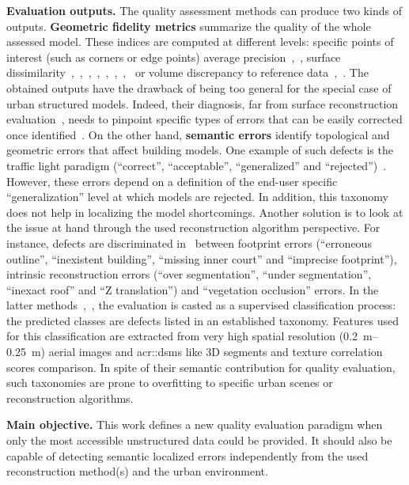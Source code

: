 \documentclass[runningheads]{llncs}
\begin{document}
\noindent
\textbf{Evaluation outputs.}
The quality assessment methods can produce two kinds of outputs. \textbf{Geometric fidelity metrics} summarize the quality of the whole assessed model. These indices are computed at different levels: specific points of interest (such as corners or edge points) average precision~\cite{vogtle2003quality},~\cite{Kaartinen2005}, surface dissimilarity~\cite{jaynes2003recognition},~\cite{dick2004modelling},~\cite{Kaartinen2005},~\cite{zebedin2008fusion},~\cite{lafarge2012creating},~\cite{Zeng2014},~\cite{li2016boxfitting},~\cite{nan2017polyfit} or volume discrepancy to reference data~\cite{jaynes2003recognition},~\cite{Zeng2014}. The obtained outputs have the drawback of being too general for the special case of urban structured models. Indeed, their diagnosis, far from surface reconstruction evaluation~\cite{berger2013benchmark}, needs to pinpoint specific types of errors that can be easily corrected once identified~\cite{OudeElberink2010}. On the other hand, \textbf{semantic errors} identify topological and geometric errors that affect building models. One example of such defects is the traffic light paradigm (``correct'', ``acceptable'', ``generalized'' and ``rejected'')~\cite{boudet2006supervised}. However, these errors depend on a  definition of the end-user specific ``generalization'' level at which models are rejected. In addition, this taxonomy does not help in localizing the model shortcomings. Another solution is to look at the issue at hand through the used reconstruction algorithm perspective. For instance, defects are discriminated in~\cite{Michelin2013} between footprint errors (``erroneous outline'', ``inexistent building'', ``missing inner court'' and ``imprecise footprint''), intrinsic reconstruction errors (``over segmentation'', ``under segmentation'', ``inexact roof'' and ``Z translation'') and ``vegetation occlusion'' errors. In the latter methods~\cite{boudet2006supervised},~\cite{Michelin2013}, the evaluation is casted as a supervised classification process: the predicted classes are defects listed in an established taxonomy. Features used for this classification are extracted from very high spatial resolution (\SIrange{0.2}{0.25}{\m}) aerial images and \glspl{acr::dsm} like 3D segments and texture correlation scores comparison. In spite of their semantic contribution for quality evaluation, such taxonomies are prone to overfitting to specific urban scenes or reconstruction algorithms.

\noindent
\textbf{Main objective.}
This work defines a new quality evaluation paradigm when only the most accessible unstructured data could be provided. It should also be capable of detecting semantic localized errors independently from the used reconstruction method(s) and the urban environment.
\end{document}
